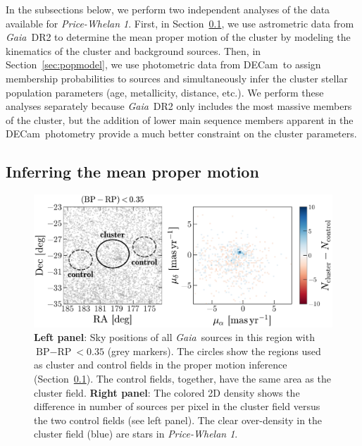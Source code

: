 \documentclass[twocolumn]{aastex62}
\newcommand{\acronym}[1]{{\small{#1}}}
\newcommand{\gaia}{\textsl{Gaia}}
\newcommand{\decam}{DECam}
\newcommand{\DR}[1]{\acronym{DR#1}}
\newcommand{\sectionname}{Section}
\newcommand{\clustername}{\textsl{Price-Whelan 1}}
\newcommand{\bprp}{\ensuremath{\textrm{BP} - \textrm{RP}}}
\begin{document}
In the subsections below, we perform two independent analyses of the data available for \clustername.
First, in \sectionname~\ref{sec:pmclean}, we use astrometric data from \gaia\ \DR{2} to determine the mean proper motion of the cluster by modeling the kinematics of the cluster and background sources.
Then, in \sectionname~\ref{sec:popmodel}, we use photometric data from \decam\ to assign membership probabilities to sources and simultaneously infer the cluster stellar population parameters (age, metallicity, distance, etc.).
We perform these analyses separately because \gaia\ \DR{2} only includes the most massive members of the cluster, but the addition of lower main sequence members apparent in the \decam\ photometry provide a much better constraint on the cluster parameters.


\subsection{Inferring the mean proper motion}
\label{sec:pmclean}

\begin{figure}[ht!]
\centering
\includegraphics[width=\textwidth]{figures/pm-model.pdf}
\caption{\textbf{Left panel}: Sky positions of all \gaia\ sources in this region with $\bprp < 0.35$ (grey markers).
The circles show the regions used as cluster and control fields in the proper motion inference (\sectionname~\ref{sec:pmclean}).
The control fields, together, have the same area as the cluster field.
\textbf{Right panel}: The colored 2D density shows the difference in number of sources per pixel in the cluster field versus the two control fields (see left panel).
The clear over-density in the cluster field (blue) are stars in \clustername.}
\label{fig:pm-members}
\end{figure}
\end{document}
